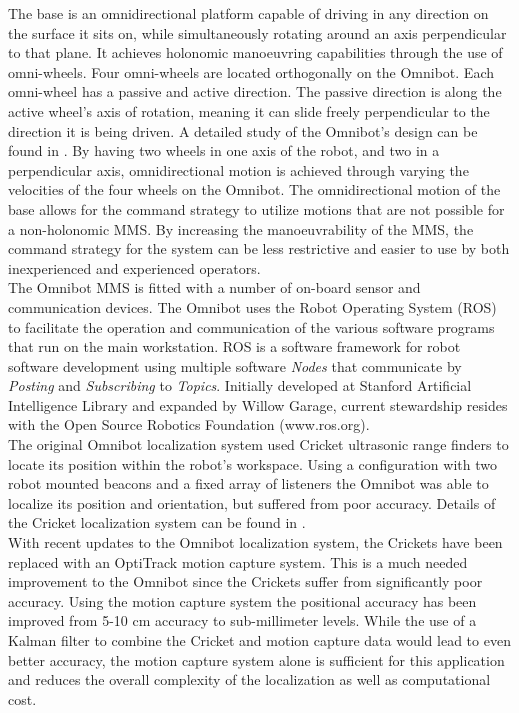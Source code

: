 \documentclass[onecolumn,10pt,final]{asme2ej}
\begin{document}
The base is an omnidirectional platform capable of driving in any direction on the surface it sits on, while simultaneously rotating around an axis perpendicular to that plane. It achieves holonomic manoeuvring capabilities through the use of omni-wheels. Four omni-wheels are located orthogonally on the Omnibot. Each omni-wheel has a passive and active direction. The passive direction is along the active wheel's axis of rotation, meaning it can slide freely perpendicular to the direction it is being driven. A detailed study of the Omnibot's design can be found in \cite{bemis}. By having two wheels in one axis of the robot, and two in a perpendicular axis, omnidirectional motion is achieved through varying the velocities of the four wheels on the Omnibot. The omnidirectional motion of the base allows for the command strategy to utilize motions that are not possible for a non-holonomic MMS. By increasing the manoeuvrability of the MMS, the command strategy for the system can be less restrictive and easier to use by both inexperienced and experienced operators.\\
 
The Omnibot MMS is fitted with a number of on-board sensor and communication devices. The Omnibot uses the Robot Operating System (ROS) to facilitate the operation and communication of the various software programs that run on the main workstation. ROS is a software framework for robot software development using multiple software \textit{Nodes} that communicate by \textit{Posting} and \textit{Subscribing} to \textit{Topics}. Initially developed at Stanford Artificial Intelligence Library and expanded by Willow Garage, current stewardship resides with the Open Source Robotics Foundation (www.ros.org).\\

The original Omnibot localization system used Cricket ultrasonic range finders to locate its position within the robot's workspace. Using a configuration with two robot mounted beacons and a fixed array of listeners the Omnibot was able to localize its position and orientation, but suffered from poor accuracy. Details of the Cricket localization system can be found in \cite{sasha}.\\

With recent updates to the Omnibot localization system, the Crickets have been replaced with an OptiTrack motion capture system. This is a much needed improvement to the Omnibot since the Crickets suffer from significantly poor accuracy. Using the motion capture system the positional accuracy has been improved from 5-10 cm accuracy to sub-millimeter levels. While the use of a Kalman filter to combine the Cricket and motion capture data would lead to even better accuracy, the motion capture system alone is sufficient for this application and reduces the overall complexity of the localization as well as computational cost.\\
\end{document}
